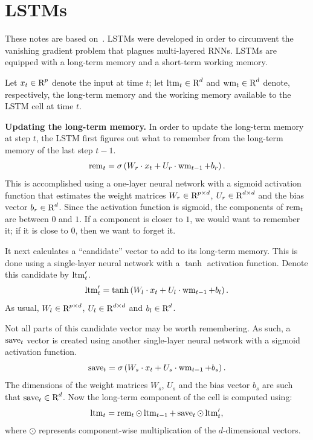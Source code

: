 \section{LSTMs}
These notes are based on~\cite{EChen,COlah}. LSTMs were developed in order to
circumvent the vanishing gradient problem that
plagues multi-layered RNNs. LSTMs are equipped with a long-term memory and a
short-term working memory.

Let $x_t \in \text{R}^{p}$ denote the input at time $t$; let $\operatorname{ltm}_{t} \in \text{R}^{d}$
and $\operatorname{wm}_{t} \in \text{R}^{d}$ denote, respectively, the long-term memory and the
working memory available to the LSTM cell at time $t$.

\medskip

\noindent \textbf{Updating the long-term memory.} In order to update the long-term
memory at step $t$, the LSTM first figures out what to remember from the
long-term memory of the last step $t - 1$.
\begin{equation}
\operatorname{rem}_{t} = \sigma \left ( W_r \cdot x_t + U_r \cdot \operatorname{wm}_{t - 1} + b_r \right ).
\end{equation}
This is accomplished using a one-layer neural network with a sigmoid activation
function that estimates the weight matrices $W_r \in \text{R}^{p \times d}$,
$U_r \in \text{R}^{d \times d}$ and the bias vector $b_r \in \text{R}^{d}$. Since the
activation function is sigmoid, the components of $\operatorname{rem}_t$ are between $0$ and
$1$. If a component is closer to $1$, we would want to remember it; if it is
close to $0$, then we want to forget it.

It next calculates a ``candidate'' vector to add to its long-term memory. This
is done using a single-layer neural network with a $\tanh$ activation function.
Denote this candidate by $\operatorname{ltm}_{t}'$.
\begin{equation}
\operatorname{ltm}_{t}' = \tanh \left ( W_l \cdot x_t + U_l \cdot \operatorname{wm}_{t - 1} + b_l \right ).
\end{equation}
As usual, $W_l \in \text{R}^{p \times d}$, $U_l \in \text{R}^{d \times d}$ and $b_l \in \text{R}^{d}$.

Not all parts of this candidate vector may be worth remembering. As such, a
$\operatorname{save}_{t}$ vector is created using another single-layer neural network with a
sigmoid activation function.
\begin{equation}
\operatorname{save}_{t} = \sigma \left ( W_s \cdot x_t + U_s \cdot \operatorname{wm}_{t - 1} + b_s \right ).
\end{equation}
The dimensions of the weight matrices $W_s$, $U_s$ and the bias vector $b_s$
are such that $\operatorname{save}_{t} \in \text{R}^{d}$.
Now the long-term component of the cell is computed using:
\begin{equation}
\operatorname{ltm}_{t} = \operatorname{rem}_{t} \odot \operatorname{ltm}_{t - 1} + \operatorname{save}_{t} \odot \operatorname{ltm}_{t}',
\end{equation}
where $\odot$ represents component-wise multiplication of the $d$-dimensional
vectors.

